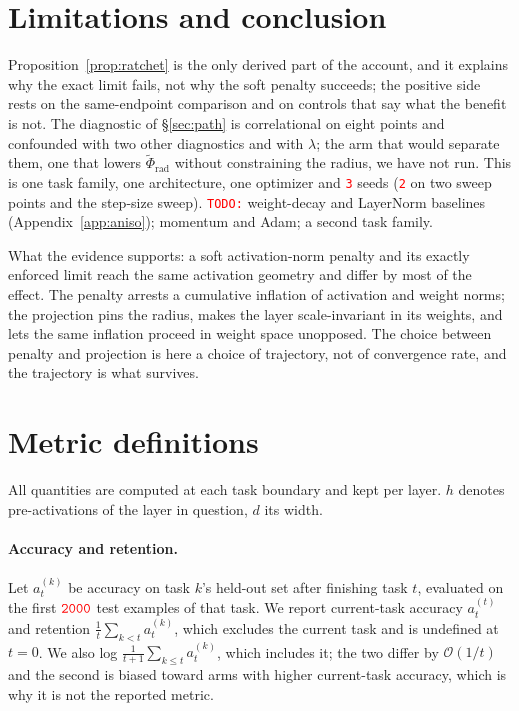 \documentclass[anon]{opt2026}     %
\newcommand{\PH}[1]{\textcolor{red}{\texttt{#1}}}   %
\newcommand{\phirad}{\tilde{\Phi}_{\mathrm{rad}}}
\begin{document}
\section{Limitations and conclusion}
\label{sec:conclusion}

Proposition~\ref{prop:ratchet} is the only derived part of the account, and it
explains why the exact limit fails, not why the soft penalty succeeds; the
positive side rests on the same-endpoint comparison and on controls that say
what the benefit is not. The diagnostic of \S\ref{sec:path} is correlational on
eight points and confounded with two other diagnostics and with $\lambda$; the
arm that would separate them, one that lowers $\phirad$ without constraining
the radius, we have not run. This is one task family, one architecture, one
optimizer and \PH{3} seeds (\PH{2} on two sweep points and the step-size
sweep). \PH{TODO:} weight-decay and LayerNorm baselines
(Appendix~\ref{app:aniso}); momentum and Adam; a second task family.

What the evidence supports: a soft activation-norm penalty and its exactly
enforced limit reach the same activation geometry and differ by most of
the effect. The penalty arrests a cumulative inflation of activation and weight
norms; the projection pins the radius, makes the layer scale-invariant in its
weights, and lets the same inflation proceed in weight space unopposed. The
choice between penalty and projection is here a choice of trajectory, not of
convergence rate, and the trajectory is what survives.



\newpage
\appendix
\section{Metric definitions}
\label{app:metrics}

All quantities are computed at each task boundary and kept per layer. $h$ denotes
pre-activations of the layer in question, $d$ its width.

\paragraph{Accuracy and retention.} Let $a_t^{(k)}$ be accuracy on task $k$'s
held-out set after finishing task $t$, evaluated on the first $\PH{2000}$ test
examples of that task. We report current-task accuracy $a_t^{(t)}$ and retention
$\frac{1}{t}\sum_{k<t} a_t^{(k)}$, which excludes the current task and is
undefined at $t = 0$. We also log
$\frac{1}{t+1}\sum_{k \le t} a_t^{(k)}$, which includes it; the two differ by
$\mathcal{O}(1/t)$ and the second is biased toward arms with higher current-task
accuracy, which is why it is not the reported metric.
\end{document}
